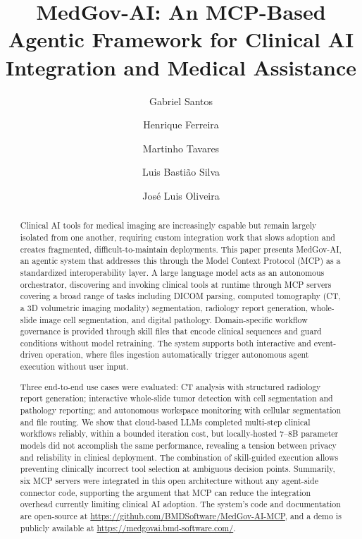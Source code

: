 \documentclass[1p,12pt]{elsarticle}
\begin{document}
\begin{frontmatter}

\title{MedGov-AI: An MCP-Based Agentic Framework for Clinical AI Integration and Medical Assistance}

\author[1]{Gabriel Santos}
\author[1]{Henrique Ferreira}
\author[2]{Martinho Tavares}
\author[2]{Luis Basti\~ao Silva}
\author[1]{José Luis Oliveira}
\address[1]{University of Aveiro, Aveiro, Portugal}
\address[2]{BMD Software, Ílhavo, Portugal}

\begin{abstract}
Clinical AI tools for medical imaging are increasingly capable but remain largely isolated from one another, requiring custom integration work that slows adoption and creates fragmented, difficult-to-maintain deployments. This paper presents MedGov-AI, an agentic system that addresses this through the Model Context Protocol (MCP) as a standardized interoperability layer. A large language model acts as an autonomous orchestrator, discovering and invoking clinical tools at runtime through MCP servers covering a broad range of tasks including DICOM parsing, computed tomography (CT, a 3D volumetric imaging modality) segmentation, radiology report generation, whole-slide image cell segmentation, and digital pathology. Domain-specific workflow governance is provided through skill files that encode clinical sequences and guard conditions without model retraining. The system supports both interactive and event-driven operation, where files ingestion automatically trigger autonomous agent execution without user input.

Three end-to-end use cases were evaluated: CT analysis with structured radiology report generation; interactive whole-slide tumor detection with cell segmentation and pathology reporting; and autonomous workspace monitoring with cellular segmentation and file routing. We show that cloud-based LLMs completed multi-step clinical workflows reliably, within a bounded iteration cost, but locally-hosted 7--8B parameter models did not accomplish the same performance, revealing a tension between privacy and reliability in clinical deployment. The combination of skill-guided execution allows preventing clinically incorrect tool selection at ambiguous decision points. Summarily, six MCP servers were integrated in this open architecture without any agent-side connector code, supporting the argument that MCP can reduce the integration overhead currently limiting clinical AI adoption. The system's code and documentation are open-source at \url{https://github.com/BMDSoftware/MedGov-AI-MCP}, and a demo is publicly available at \url{https://medgovai.bmd-software.com/}.
\end{abstract}


\end{frontmatter}
\end{document}
